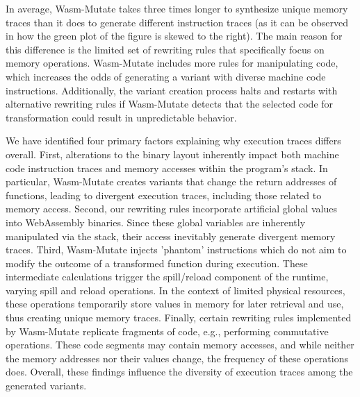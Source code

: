 \documentclass[a4paper,fleqn]{cas-dc}
\newcommand*\badge[1]{ \colorbox{red}{\color{white}#1}}
\newcommand{\tool}{{\sc Wasm-Mutate}\xspace}
\newcommand{\Wasm}{WebAssembly\xspace}
\newcommand{\wasm}{\Wasm}
\newcommand{\todo}[1]{%
\refstepcounter{todo}
\noindent\textbf{\badge{TODO}} {\color{red}#1}
\addcontentsline{td}{todo}
{\color{red}\thesection.\thetodo\xspace #1}}
\begin{document}
In average, \tool takes three times longer to synthesize unique memory traces than it does to generate different instruction traces (as it can be observed in how the green plot of the figure is skewed to the right). 
The main reason for this difference is the limited set of rewriting rules that specifically focus on memory operations. 
\tool includes more rules for manipulating code, which increases the odds of generating a variant with diverse machine code instructions.
Additionally, the variant creation process halts and restarts with alternative rewriting rules if \tool detects that the selected code for transformation could result in unpredictable behavior. 

We have identified four primary factors explaining why execution traces differs overall.
First, alterations to the binary layout inherently impact both machine code instruction traces and memory accesses within the program's stack. 
In particular, \tool creates variants that change the return addresses of functions, leading to divergent execution traces, including those related to memory access. 
Second, our rewriting rules incorporate artificial global values into \wasm binaries. 
Since these global variables are inherently manipulated via the stack, their access inevitably generate divergent memory traces.
Third, \tool injects 'phantom' instructions which do not aim to modify the outcome of a transformed function during execution. 
These intermediate calculations trigger the spill/reload component of the runtime, varying spill and reload operations. 
In the context of limited physical resources, these operations temporarily store values in memory for later retrieval and use, thus creating unique memory traces.
Finally, certain rewriting rules implemented by \tool replicate fragments of code, e.g., performing commutative operations. 
These code segments may contain memory accesses, and while neither the memory addresses nor their values change, the frequency of these operations does.
Overall, these findings influence the diversity of execution traces among the generated variants. 
\end{document}
